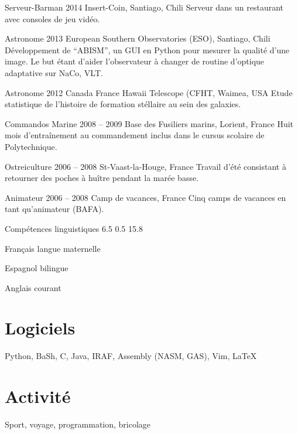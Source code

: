 \documentclass[30pt, french]{tccv}
\begin{document}
\begin{upshape}
\begin{joblist}
\item[Serveur-Barman]{2014}
	{Insert-Coin, Santiago, Chili}
	{Serveur dans un restaurant avec consoles de jeu vidéo.}


\item[Astronome]{2013}
	{European Southern Observatories (ESO), Santiago, Chili}
	{Développement de ``ABISM'', un GUI en Python pour mesurer la qualité d'une image.
 	Le but étant d'aider l'observateur à changer de routine d'optique adaptative sur NaCo, VLT.}


\item[Astronome]{2012}
	{Canada France Hawaii Telescope (CFHT, Waimea, USA}
	{Etude statistique de l'histoire de formation stéllaire au sein des galaxies.}


\item[Commandos Marine]{2008 -- 2009}
	{Base des Fusiliers marins, Lorient, France}
	{Huit mois d'entraînement au commandement inclus dans le cursus scolaire de Polytechnique.}


\item[Ostreiculture]{2006 -- 2008}
	{St-Vaast-la-Houge, France}
	{Travail d'été consistant à retourner des poches à huître pendant la marée basse.}


\item[Animateur]{2006 -- 2008}
	{Camp de vacances, France}
	{Cinq camps de vacances en tant qu'animateur (BAFA).}

\end{joblist}



\begin{rounded_frame}{Compétences linguistiques}{ 6.5 } { 0.5 }{ 15.8 }{}


\begin{languagelist}
\item{Français}	{langue maternelle}
\item{Espagnol}	{bilingue}
\item{Anglais}	{courant} 
\end{languagelist}

\section{Logiciels}
		Python, 
		BaSh, 
		C, 
		Java,
		IRAF, 
		Assembly (NASM, GAS), 
		Vim, 
		\LaTeX


\section{Activité}
	Sport, voyage, programmation, bricolage



\end{rounded_frame}



\end{upshape}
\end{document}
